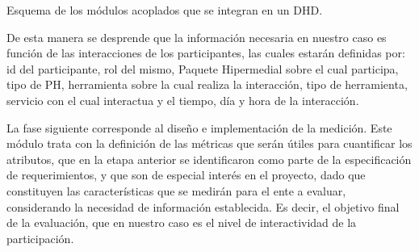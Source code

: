 \caption{Esquema de los módulos acoplados que se integran en un DHD.}



De esta manera se desprende que la información necesaria en nuestro caso es función de las interacciones de los participantes, las cuales estarán definidas por: id del participante, rol del mismo, Paquete Hipermedial sobre el cual participa, tipo de PH, herramienta sobre la cual realiza la interacción, tipo de herramienta, servicio con el cual interactua y el tiempo, día y hora de la interacción.

La fase siguiente corresponde al diseño e implementación de la medición. Este módulo trata con la definición de las métricas que serán útiles para cuantificar los atributos, que en la etapa anterior se identificaron como parte de la especificación de requerimientos, y que son de especial interés en el proyecto, dado que constituyen las características que se medirán para el ente a evaluar, considerando la necesidad de información establecida. Es decir, el objetivo final de la evaluación, que en nuestro caso es el nivel de interactividad de la participación.


